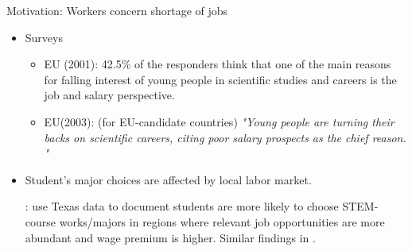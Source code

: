 \documentclass[9pt,xcolor={svgnames}]{beamer}
\begin{document}
\begin{frame}{Motivation: Workers concern  shortage of jobs}

\begin{itemize}



\item Surveys
\begin{itemize}
\item EU (2001): 42.5\% of the responders think that one of the main reasons for falling interest of young
people in scientific studies and careers is the job and salary perspective. 

    \item EU(2003): (for EU-candidate countries) \textit{ "Young people are turning their backs on scientific careers, citing poor salary prospects as the chief reason. " }

\end{itemize}



\vspace{3mm}


    \item Student's major choices are affected by local labor market. 

    \vspace{2mm}
    
    \textcolor{blue}{\cite{mather2025hometown}}: use Texas data to document students are more likely to choose STEM-course works/majors in regions where relevant job opportunities are more abundant and wage premium is higher.  Similar findings in \textcolor{blue}{\cite{conzelmann2023skills}}.

    
\end{itemize}


\end{frame}
\end{document}
